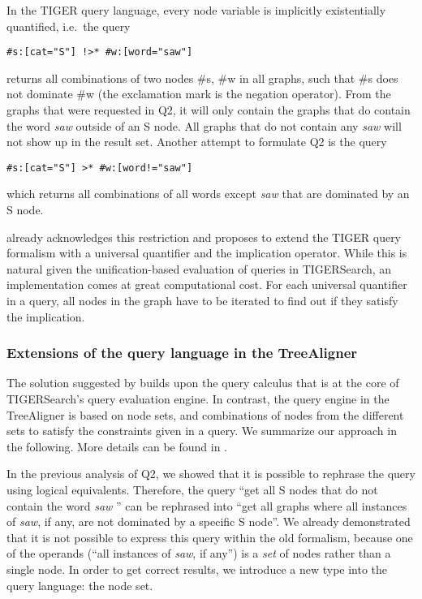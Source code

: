 \documentclass[output=paper]{LSP/langsci}
\begin{document}
In the TIGER query language, every node variable is implicitly existentially quantified, i.e.~the query 

\ea
\begin{lstlisting}
#s:[cat="S"] !>* #w:[word="saw"] 
\end{lstlisting}
\z

\noindent returns all combinations of two nodes \#s, \#w in all graphs, such that \#s does not dominate \#w (the exclamation mark is the negation operator). From the graphs that were requested in Q2, it will only contain the graphs that do contain the word \textit{saw} outside of an S node. All graphs that do not contain any \textit{saw} will not show up in the result set. Another attempt to formulate Q2 is the query 

\ea
\begin{lstlisting}
#s:[cat="S"] >* #w:[word!="saw"] 
\end{lstlisting}
\z
 
\noindent which returns all combinations of all words except \textit{saw} that are dominated by an S node. 
 
\citet{Lezius2002b} already acknowledges this restriction and proposes to extend the TIGER query formalism with a universal quantifier and the implication operator. While this is natural given the unification-based evaluation of queries in TIGERSearch, an implementation comes at great computational cost. For each universal quantifier in a query, all nodes in the graph have to be iterated to find out if they satisfy the implication. 

\subsubsection{Extensions of the query language in the TreeAligner}\label{sec:volk:3.2.2}

The solution suggested by \citet{Lezius2002b} builds upon the query calculus that is at the core of TIGERSearch's query evaluation engine. In contrast, the query engine in the TreeAligner is based on node sets, and combinations of nodes from the different sets to satisfy the constraints given in a query. We summarize our approach in the following. More details can be found in \citet{MarekEtAl2008}. 

In the previous analysis of Q2, we showed that it is possible to rephrase the query using logical equivalents. Therefore, the query ``get all S nodes that do not contain the word \textit{saw} '' can be rephrased into ``get all graphs where all instances of \textit{saw}, if any, are not dominated by a specific S node''. We already demonstrated that it is not possible to express this query within the old formalism, because one of the operands (``all instances of \textit{saw}, if any'') is a \textit{set} of nodes rather than a single node. In order to get correct results, we introduce a new type into the query language: the node set. 
\end{document}
